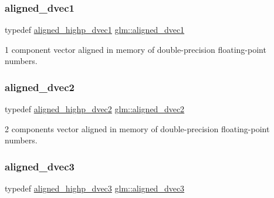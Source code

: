 \subsubsection{\texorpdfstring{aligned\+\_\+dvec1}{aligned\_dvec1}}
{\footnotesize\ttfamily typedef \mbox{\hyperlink{group__gtc__type__aligned_ga85671dcb7eef983b5035273fe78dd963}{aligned\+\_\+highp\+\_\+dvec1}} \mbox{\hyperlink{group__gtc__type__aligned_ga81fe4410dc880770293c53fcba83c9e4}{glm\+::aligned\+\_\+dvec1}}}



1 component vector aligned in memory of double-\/precision floating-\/point numbers. 

\mbox{\label{group__gtc__type__aligned_ga1e6972e837bc34b3424af8d63a71d7c6}} 
\subsubsection{\texorpdfstring{aligned\+\_\+dvec2}{aligned\_dvec2}}
{\footnotesize\ttfamily typedef \mbox{\hyperlink{group__gtc__type__aligned_gadc0edec95aa740d8ec351ef1e2dd39de}{aligned\+\_\+highp\+\_\+dvec2}} \mbox{\hyperlink{group__gtc__type__aligned_ga1e6972e837bc34b3424af8d63a71d7c6}{glm\+::aligned\+\_\+dvec2}}}



2 components vector aligned in memory of double-\/precision floating-\/point numbers. 

\mbox{\label{group__gtc__type__aligned_ga82da11893fbac3bda647c9de9da62693}} 
\subsubsection{\texorpdfstring{aligned\+\_\+dvec3}{aligned\_dvec3}}
{\footnotesize\ttfamily typedef \mbox{\hyperlink{group__gtc__type__aligned_gafb21f8db25007665c2cb2a9b250471aa}{aligned\+\_\+highp\+\_\+dvec3}} \mbox{\hyperlink{group__gtc__type__aligned_ga82da11893fbac3bda647c9de9da62693}{glm\+::aligned\+\_\+dvec3}}}




